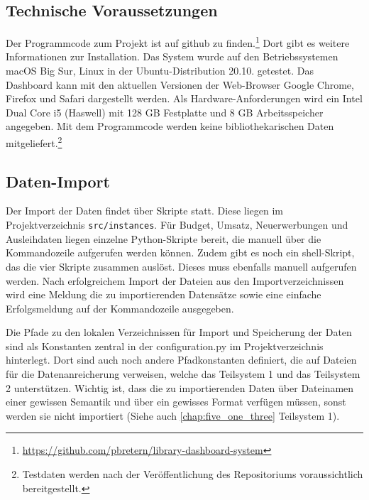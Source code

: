     \subsection{Technische Voraussetzungen}
    Der Programmcode zum Projekt ist auf github zu finden.\footnote{\url{https://github.com/pbretern/library-dashboard-system}} Dort gibt es weitere Informationen zur Installation.
    Das System wurde auf den Betriebssystemen macOS Big Sur, Linux in der Ubuntu-Distribution 20.10. getestet.
    Das Dashboard kann mit den aktuellen Versionen der Web-Browser Google Chrome, Firefox und Safari dargestellt werden. 
    Als Hardware-Anforderungen wird ein Intel Dual Core i5 (Haswell) mit 128 GB Festplatte und 8 GB Arbeitsspeicher angegeben. 
    Mit dem Programmcode werden keine bibliothekarischen Daten mitgeliefert.\footnote{Testdaten werden nach der Veröffentlichung des Repositoriums voraussichtlich
    bereitgestellt.}
    
    \subsection{Daten-Import}
    Der Import der Daten findet über Skripte statt. Diese liegen im Projektverzeichnis \texttt{src/instances}.
    Für Budget, Umsatz, Neuerwerbungen und Ausleihdaten liegen einzelne Python-Skripte bereit, die manuell über die Kommandozeile
    aufgerufen werden können. Zudem gibt es noch ein shell-Skript, das die vier Skripte zusammen auslöst. Dieses
    muss ebenfalls manuell aufgerufen werden.
    Nach erfolgreichem Import der Dateien aus den Importverzeichnissen wird eine Meldung die zu importierenden Datensätze sowie eine 
    einfache Erfolgsmeldung auf der Kommandozeile ausgegeben.

    Die Pfade zu den lokalen Verzeichnissen für Import und Speicherung der Daten sind als Konstanten zentral in der configuration.py 
    im Projektverzeichnis hinterlegt. Dort sind auch noch andere Pfadkonstanten definiert, die auf Dateien für die Datenanreicherung verweisen, welche das Teilsystem 1
    und das Teilsystem 2 unterstützen. Wichtig ist, dass die zu importierenden Daten über Dateinamen einer gewissen Semantik und 
    über ein gewisses Format verfügen müssen, sonst werden sie nicht importiert (Siehe auch \autoref{chap:five_one_three} Teilsystem 1).

